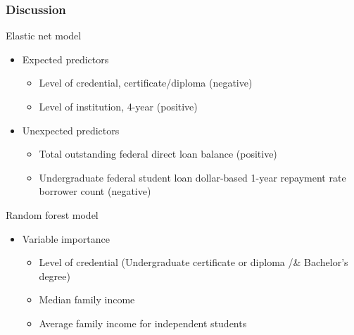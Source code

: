 \documentclass[aspectratio=169, t, 10pt]{beamer}
\begin{document}
\begin{frame}
  \frametitle{Discussion}
  \begin{block}{Elastic net model}
    \begin{itemize}
    \item Expected predictors 
      \begin{itemize}
         \item Level of credential, certificate/diploma (negative)
         \item Level of institution, 4-year (positive)
      \end{itemize}
    \item Unexpected predictors
       \begin{itemize}
         \item Total outstanding federal direct loan balance (positive)
         \item Undergraduate federal student loan dollar-based 1-year
           repayment rate borrower count (negative)
      \end{itemize}    
    \end{itemize}
  \end{block}
  \begin{block}{Random forest model}
    \begin{itemize}
    \item Variable importance
      \begin{itemize}
        \item Level of credential (Undergraduate certificate or
          diploma /& Bachelor's degree)
        \item Median family income
        \item Average family income for independent students
       \end{itemize}
    \end{itemize}
   \end{block}    
\end{frame}
 
\end{document}
